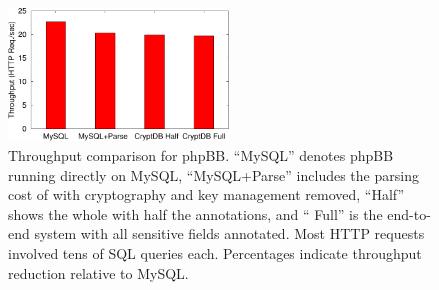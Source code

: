 


\begin{figure}[t]
\centering
\includegraphics[width=2.3in]{fig/tputbars.pdf} 
\caption{Throughput comparison for phpBB\@. ``MySQL'' denotes phpBB
running directly on MySQL, ``MySQL+Parse'' includes the parsing cost
of \name{} with cryptography and key management removed, ``\name Half''
shows the whole \name{} with half the annotations, and ``\name{} Full''
is the end-to-end system with all sensitive fields annotated.  Most
HTTP requests involved tens of SQL queries each.  Percentages indicate
throughput reduction relative to MySQL\@.}

\label{fig:appstput}
\end{figure}







